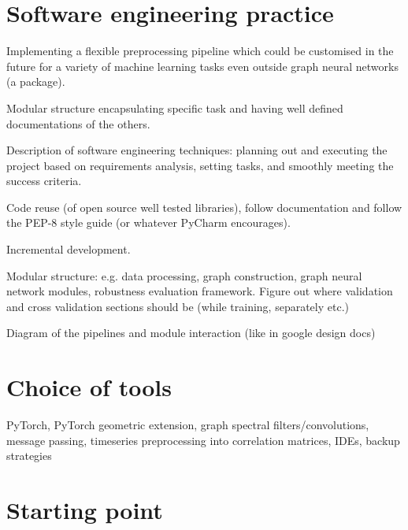 \section{Software engineering practice}
Implementing a flexible preprocessing pipeline which could be customised in the future for a variety of machine learning tasks even outside graph neural networks (a package).

Modular structure encapsulating specific task and having well defined documentations of the others.

Description of software engineering techniques: planning out and executing the project based on requirements analysis, setting tasks, and smoothly meeting the success criteria.

Code reuse (of open source well tested libraries), follow documentation and follow the PEP-8 style guide (or whatever PyCharm encourages).

Incremental development.

Modular structure: e.g. data processing, graph construction, graph neural network modules, robustness evaluation framework. Figure out where validation and cross validation sections should be (while training, separately etc.)

Diagram of the pipelines and module interaction (like in google design docs)


\section{Choice of tools}
PyTorch, PyTorch geometric extension, graph spectral filters/convolutions, message passing, timeseries preprocessing into correlation matrices, IDEs, backup strategies

\section{Starting point}
